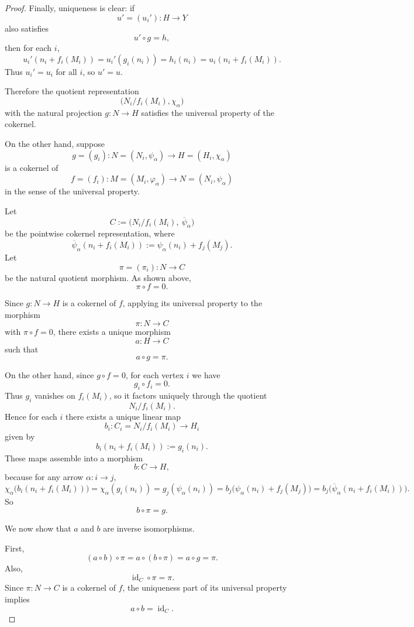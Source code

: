 \documentclass[11pt, a4paper]{report}
\begin{document}
\begin{proof}
    Finally, uniqueness is clear: if
    \[
        u'=(u_i'):H\to Y
    \]
    also satisfies
    \[
        u'\circ g=h,
    \]
    then for each $i$,
    \[
        u_i'(n_i+f_i(M_i))
        =u_i'(g_i(n_i))
        =h_i(n_i)
        =u_i(n_i+f_i(M_i)).
    \]
    Thus $u_i'=u_i$ for all $i$, so $u'=u$.

    Therefore the quotient representation
    \[
        \bigl(N_i/f_i(M_i),\chi_\alpha\bigr)
    \]
    with the natural projection $g:N\to H$ satisfies the universal property of the cokernel.

    On the other hand, suppose
    \[
        g=(g_i):N=(N_i,\psi_\alpha)\to H=(H_i,\chi_\alpha)
    \]
    is a cokernel of
    \[
        f=(f_i):M=(M_i,\varphi_\alpha)\to N=(N_i,\psi_\alpha)
    \]
    in the sense of the universal property.

    Let
    \[
        C:=\bigl(N_i/f_i(M_i),\ \overline{\psi}_\alpha\bigr)
    \]
    be the pointwise cokernel representation, where
    \[
        \overline{\psi}_\alpha(n_i+f_i(M_i))
        :=\psi_\alpha(n_i)+f_j(M_j).
    \]
    Let
    \[
        \pi=(\pi_i):N\to C
    \]
    be the natural quotient morphism. As shown above,
    \[
        \pi\circ f=0.
    \]

    Since $g:N\to H$ is a cokernel of $f$, applying its universal property to the morphism
    \[
        \pi:N\to C
    \]
    with $\pi\circ f=0$, there exists a unique morphism
    \[
        a:H\to C
    \]
    such that
    \[
        a\circ g=\pi.
    \]

    On the other hand, since $g\circ f=0$, for each vertex $i$ we have
    \[
        g_i\circ f_i=0.
    \]
    Thus $g_i$ vanishes on $f_i(M_i)$, so it factors uniquely through the quotient
    \[
        N_i/f_i(M_i).
    \]
    Hence for each $i$ there exists a unique linear map
    \[
        b_i:C_i=N_i/f_i(M_i)\to H_i
    \]
    given by
    \[
        b_i(n_i+f_i(M_i)):=g_i(n_i).
    \]
    These maps assemble into a morphism
    \[
        b:C\to H,
    \]
    because for any arrow $\alpha:i\to j$,
    \[
        \chi_\alpha\bigl(b_i(n_i+f_i(M_i))\bigr)
        =\chi_\alpha(g_i(n_i))
        =g_j(\psi_\alpha(n_i))
        =b_j\bigl(\psi_\alpha(n_i)+f_j(M_j)\bigr)
        =b_j\bigl(\overline{\psi}_\alpha(n_i+f_i(M_i))\bigr).
    \]
    So
    \[
        b\circ \pi=g.
    \]

    We now show that $a$ and $b$ are inverse isomorphisms.

    First,
    \[
        (a\circ b)\circ \pi
        =a\circ (b\circ \pi)
        =a\circ g
        =\pi.
    \]
    Also,
    \[
        \operatorname{id}_C\circ \pi=\pi.
    \]
    Since $\pi:N\to C$ is a cokernel of $f$, the uniqueness part of its universal property implies
    \[
        a\circ b=\operatorname{id}_C.
    \]


\end{proof}
\end{document}
